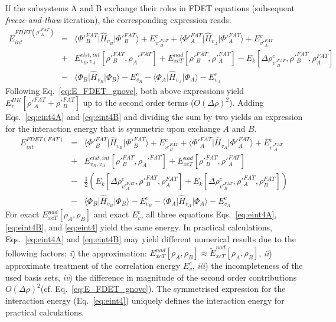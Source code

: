 \documentclass[amsmath,amssymb,preprint,aip,jcp]{revtex4-1}
\begin{document}
If the subsystems A and B exchange their roles in FDET equations (subsequent \textit{freeze-and-thaw} iteration), the corresponding 
expression reads:
 \begin{eqnarray}
E_{int}^{FDET(\rho'^{FAT}_A)} 
&=& \langle\Phi'^{FAT}_{B}\vert \hat{H}_{v_B}\vert \Phi'^{FAT}_{B}\rangle + E^{c}_{v'^{FAT}_B} + \langle\Phi'^{FAT}_{A}\vert \hat{H}_{v_A}\vert \Phi'^{FAT}_{A}\rangle + E^{c}_{v'^{FAT}_A} \label{eq:eint4B}\\ \nonumber
&+& E^{elst,int}_{v_B,v_A}[\rho'^{FAT}_B,\rho_A'^{FAT}] + {E}_{xcT}^{nad}[\rho'^{FAT}_B,\rho'^{FAT}_A]- E_k[\Delta \rho^{c}_{v'^{FAT}_B}, \rho'^{FAT}_B, \rho^{FAT}_A] \nonumber\\
&-& 
\langle\Phi_{B}\vert \hat{H}_{v_B}\vert \Phi_{B}\rangle - E^{c}_{v_B}
- \langle\Phi_{A}\vert \hat{H}_{v_A}\vert \Phi_{A}\rangle - E^{c}_{v_A}\nonumber
\end{eqnarray}
Following Eq.~\ref{eq:E_FDET_gnovc}, both above expressions yield $E_{v}^{HK}[\rho'^{FAT}_A+\rho'^{FAT}_B]$ up to the second order terms ($O(\Delta\rho)^2$). 
Adding Eqs.~\ref{eq:eint4A} and \ref{eq:eint4B} and dividing the sum by two yields an expression for the interaction energy that is symmetric upon exchange $A$ and $B$.
\begin{eqnarray}
E_{int}^{FDET(FAT)} 
&=& \langle\Phi'^{FAT}_{B}\vert \hat{H}_{v_B}\vert \Phi'^{FAT}_{B}\rangle + E^{c}_{v'^{FAT}_B} + \langle\Phi'^{FAT}_{A}\vert \hat{H}_{v_A}\vert \Phi'^{FAT}_{A}\rangle + E^{c}_{v'^{FAT}_A} \label{eq:eint4}\\ \nonumber
&+& E^{elst,int}_{v_B,v_A}[\rho'^{FAT}_B,\rho_A'^{FAT}] + {E}_{xcT}^{nad}[\rho'^{FAT}_B,\rho'^{FAT}_A] \nonumber \\
&-& \frac{1}{2}\left(E_k[\Delta \rho^{c}_{v'^{FAT}_A}, \rho'^{FAT}_B, \rho^{FAT}_A] + E_k[\Delta \rho^{c}_{v'^{FAT}_B}, \rho'^{FAT}_A, \rho^{FAT}_B] \right) \nonumber\\
&-& 
\langle\Phi_{B}\vert \hat{H}_{v_B}\vert \Phi_{B}\rangle - E^{c}_{v_B}
- \langle\Phi_{A}\vert \hat{H}_{v_A}\vert \Phi_{A}\rangle - E^{c}_{v_A}\nonumber
\end{eqnarray}
For exact ${E}_{xcT}^{nad}[\rho_A,\rho_B]$ and exact $E^c_{v}$, all three equations
Eqs.~\ref{eq:eint4A}, \ref{eq:eint4B}, and \ref{eq:eint4} yield the same energy.
In practical calculations, 
Eqs.~\ref{eq:eint4A} and \ref{eq:eint4B} may yield different numerical results due to the following factors:
{\it i}) the approximation: ${E}_{xcT}^{nad}[\rho_A,\rho_B]\approx \tilde{E}_{xcT}^{nad}[\rho_A,\rho_B]$, 
{\it ii}) approximate treatment of the correlation energy $E^c_{v}$, {\it iii}) the incompleteness of the used basis sets, {\it iv}) the difference in magnitude of the second order contributions $O(\Delta\rho)^2$(cf. Eq.~\ref{eq:E_FDET_gnovc}).
The symmetrised expression for the interaction energy (Eq.~\ref{eq:eint4}) uniquely defines the interaction energy for practical calculations.
\end{document}
